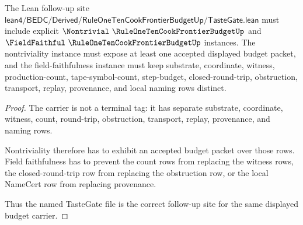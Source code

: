 

\begin{theorem}
\label{thm:rule110-cook-frontier-budget-tastegate-handoff}
The Lean follow-up site $\mathsf{lean4/BEDC/Derived/RuleOneTenCookFrontierBudgetUp/TasteGate.lean}$ must include explicit $\Nontrivial\ \RuleOneTenCookFrontierBudgetUp$ and $\FieldFaithful\ \RuleOneTenCookFrontierBudgetUp$ instances. The nontriviality instance must expose at least one accepted displayed budget packet, and the field-faithfulness instance must keep substrate, coordinate, witness, production-count, tape-symbol-count, step-budget, closed-round-trip, obstruction, transport, replay, provenance, and local naming rows distinct.
\end{theorem}
\begin{proof}
The carrier is not a terminal tag: it has separate substrate, coordinate, witness, count, round-trip, obstruction, transport, replay, provenance, and naming rows.

Nontriviality therefore has to exhibit an accepted budget packet over those rows. Field faithfulness has to prevent the count rows from replacing the witness rows, the closed-round-trip row from replacing the obstruction row, or the local NameCert row from replacing provenance.

Thus the named TasteGate file is the correct follow-up site for the same displayed budget carrier.
\end{proof}


